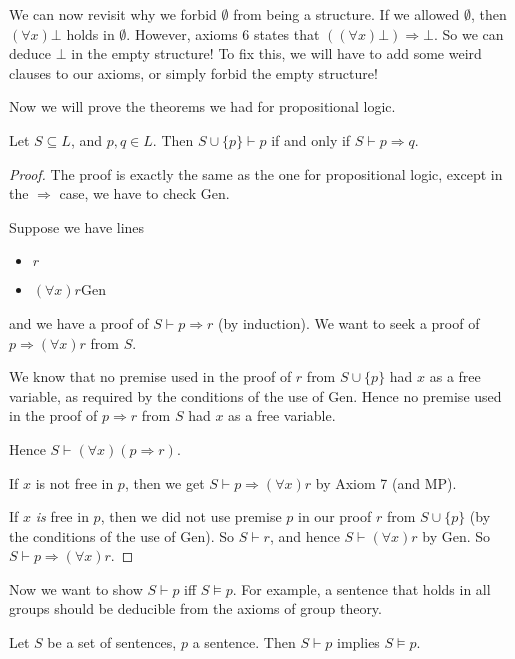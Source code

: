 \documentclass[a4paper]{article}
\begin{document}
We can now revisit why we forbid $\emptyset$ from being a structure. If we allowed $\emptyset$, then $(\forall x)\bot$ holds in $\emptyset$. However, axioms 6 states that $((\forall x)\bot )\Rightarrow \bot$. So we can deduce $\bot$ in the empty structure! To fix this, we will have to add some weird clauses to our axioms, or simply forbid the empty structure!

Now we will prove the theorems we had for propositional logic.
\begin{prop}
  Let $S\subseteq L$, and $p, q\in L$. Then $S\cup \{p\}\vdash p$ if and only if $S\vdash p\Rightarrow q$.
\end{prop}

\begin{proof}
  The proof is exactly the same as the one for propositional logic, except in the $\Rightarrow $ case, we have to check Gen.

  Suppose we have lines
  \begin{itemize}
    \item $r$
    \item $(\forall x) r$\hfill Gen
  \end{itemize}
  and we have a proof of $S\vdash p\Rightarrow r$ (by induction). We want to seek a proof of $p\Rightarrow (\forall x)r$ from $S$.

  We know that no premise used in the proof of $r$ from $S\cup \{p\}$ had $x$ as a free variable, as required by the conditions of the use of Gen. Hence no premise used in the proof of $p\Rightarrow r$ from $S$ had $x$ as a free variable.

  Hence $S\vdash (\forall x)(p\Rightarrow r)$.

  If $x$ is not free in $p$, then we get $S\vdash p\Rightarrow (\forall x)r$ by Axiom 7 (and MP).

  If $x$ \emph{is} free in $p$, then we did not use premise $p$ in our proof $r$ from $S\cup \{p\}$ (by the conditions of the use of Gen). So $S\vdash r$, and hence $S\vdash (\forall x)r$ by Gen. So $S\vdash p\Rightarrow (\forall x)r$.
\end{proof}

Now we want to show $S\vdash p$ iff $S\models p$. For example, a sentence that holds in all groups should be deducible from the axioms of group theory.

\begin{prop}
  Let $S$ be a set of sentences, $p$ a sentence. Then $S\vdash p$ implies $S\models p$.
\end{prop}
\end{document}
